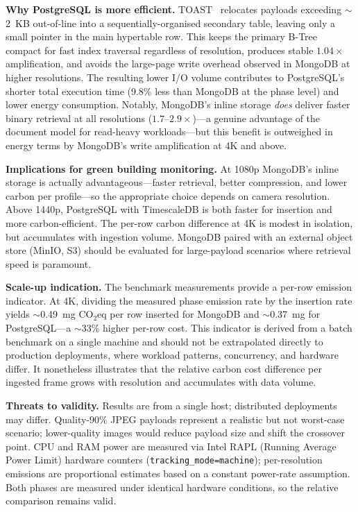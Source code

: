 \documentclass[conference]{IEEEtran}
\begin{document}
\textbf{Why PostgreSQL is more efficient.} TOAST~\cite{postgresql_toast_docs} relocates payloads exceeding $\sim$2~KB out-of-line into a sequentially-organised secondary table, leaving only a small pointer in the main hypertable row. This keeps the primary B-Tree compact for fast index traversal regardless of resolution, produces stable $1.04\times$ amplification, and avoids the large-page write overhead observed in MongoDB at higher resolutions. The resulting lower I/O volume contributes to PostgreSQL's shorter total execution time (9.8\% less than MongoDB at the phase level) and lower energy consumption. Notably, MongoDB's inline storage \emph{does} deliver faster binary retrieval at all resolutions ($1.7$--$2.9\times$)---a genuine advantage of the document model for read-heavy workloads---but this benefit is outweighed in energy terms by MongoDB's write amplification at 4K and above.

\textbf{Implications for green building monitoring.} At 1080p MongoDB's inline storage is actually advantageous---faster retrieval, better compression, and lower carbon per profile---so the appropriate choice depends on camera resolution. Above 1440p, PostgreSQL with TimescaleDB is both faster for insertion and more carbon-efficient. The per-row carbon difference at 4K is modest in isolation, but accumulates with ingestion volume. MongoDB paired with an external object store (MinIO, S3) should be evaluated for large-payload scenarios where retrieval speed is paramount.

\textbf{Scale-up indication.} The benchmark measurements provide a per-row emission indicator. At 4K, dividing the measured phase emission rate by the insertion rate yields $\sim$0.49~mg CO$_2$eq per row inserted for MongoDB and $\sim$0.37~mg for PostgreSQL---a $\sim$33\% higher per-row cost. This indicator is derived from a batch benchmark on a single machine and should not be extrapolated directly to production deployments, where workload patterns, concurrency, and hardware differ. It nonetheless illustrates that the relative carbon cost difference per ingested frame grows with resolution and accumulates with data volume.

\textbf{Threats to validity.} Results are from a single host; distributed deployments may differ. Quality-90\% JPEG payloads represent a realistic but not worst-case scenario; lower-quality images would reduce payload size and shift the crossover point. CPU and RAM power are measured via Intel RAPL (Running Average Power Limit) hardware counters (\texttt{tracking\_mode=machine}); per-resolution emissions are proportional estimates based on a constant power-rate assumption. Both phases are measured under identical hardware conditions, so the relative comparison remains valid.
\end{document}
